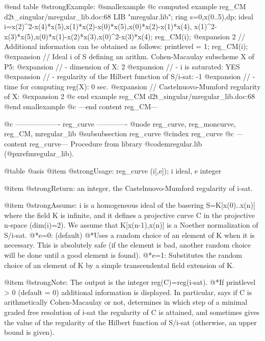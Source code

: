 @end table
@strong{Example:}
@smallexample
@c computed example reg_CM d2t_singular/mregular_lib.doc:68 
LIB "mregular.lib";
ring s=0,x(0..5),dp;
ideal i=x(2)^2-x(4)*x(5),x(1)*x(2)-x(0)*x(5),x(0)*x(2)-x(1)*x(4),
x(1)^2-x(3)*x(5),x(0)*x(1)-x(2)*x(3),x(0)^2-x(3)*x(4);
reg_CM(i);
@expansion{} 2
// Additional information can be obtained as follows:
printlevel = 1;
reg_CM(i);
@expansion{} // Ideal i of S defining an arithm. Cohen-Macaulay subscheme X of P5:
@expansion{} //   - dimension of X: 2
@expansion{} //   - i is saturated: YES
@expansion{} //   - regularity of the Hilbert function of S/i-sat: -1
@expansion{} //   - time for computing reg(X): 0 sec.
@expansion{} // Castelnuovo-Mumford regularity of X:
@expansion{} 2
@c end example reg_CM d2t_singular/mregular_lib.doc:68
@end smallexample
@c ---end content reg_CM---

@c ------------------- reg_curve -------------
@node reg_curve, reg_moncurve, reg_CM, mregular_lib
@subsubsection reg_curve
@cindex reg_curve
@c ---content reg_curve---
Procedure from library @code{mregular.lib} (@pxref{mregular_lib}).

@table @asis
@item @strong{Usage:}
reg_curve (i[,e]); i ideal, e integer

@item @strong{Return:}
an integer, the Castelnuovo-Mumford regularity of i-sat.

@item @strong{Assume:}
i is a homogeneous ideal of the basering S=K[x(0)..x(n)] where
the field K is infinite, and it defines a projective curve C in
the projective n-space (dim(i)=2). We assume that K[x(n-1),x(n)]
is a Noether normalization of S/i-sat.
@*e=0: (default)
@*Uses a random choice of an element of K when it is necessary.
This is absolutely safe (if the element is bad, another random
choice will be done until a good element is found).
@*e=1: Substitutes the random choice of an element of K by a simple
transcendental field extension of K.

@item @strong{Note:}
The output is the integer reg(C)=reg(i-sat).
@*If printlevel > 0 (default = 0) additional information is displayed.
In particular, says if C is arithmetically Cohen-Macaulay or not,
determines in which step of a minimal graded free resolution of i-sat
the regularity of C is attained, and sometimes gives the value of the
regularity of the Hilbert function of S/i-sat (otherwise, an upper
bound is given).

